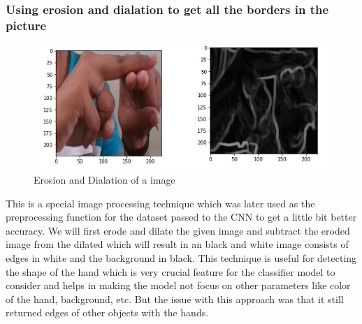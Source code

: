 \documentclass[12pt,a4paper]{report}
\begin{document}
\subsubsection{Using erosion and dialation to get all the borders in the picture}
\begin{figure}[htbp]
	\centerline{\includegraphics[scale=0.5]{erosion_dialation.jpg}}
	\caption{Erosion and Dialation of a image}
	\label{Erosion_dialation}
\end{figure}
This is a special image processing technique which was later used as the preprocessing function for the dataset passed to the CNN to get a little bit better accuracy. We will first erode and dilate the given image and subtract the eroded image from the dilated which will result in an black and white image consists of edges in white and the background in black. This technique is useful for detecting the shape of the hand which is very crucial feature for the classifier model to consider and helps in making the model not focus on other parameters like color of the hand, background, etc. But the issue with this approach was that it still returned edges of other objects with the hands.
\end{document}
